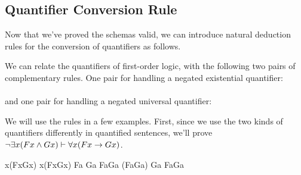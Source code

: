 \subsection{Quantifier Conversion Rule}

Now that we've proved the schemas valid, we can introduce natural deduction
rules for the conversion of quantifiers as follows.

\begin{fitchrule}
  \label{def:quantifier-conversion-rule}
  We can relate the quantifiers of first-order logic, with the following two
  pairs of complementary rules. One pair for handling a negated existential
  quantifier:\\
  \leavevmode
  \\
  and one pair for handling a negated universal quantifier: \\
\end{fitchrule}

We will use the rules in a few examples. First, since we use the two kinds of
quantifiers differently in quantified sentences, we'll prove
$\neg\exists x(Fx\wedge Gx)\vdash\forall x(Fx\rightarrow Gx)$.

\begin{fitchproof}
   {\enot\eexists x(Fx\eand Gx)} 
   {\eforall x\enot(Fx\eand Gx)} 
  \open
   {Fa}                          
  \open
   {Ga}                          
   {Fa\eand Ga}                  
   {\enot(Fa\eand Ga)}           
   {\ebot}                       
  \close
   {\enot Ga}                    
  \close
   {Fa\eif Ga}                   
         
\end{fitchproof}

